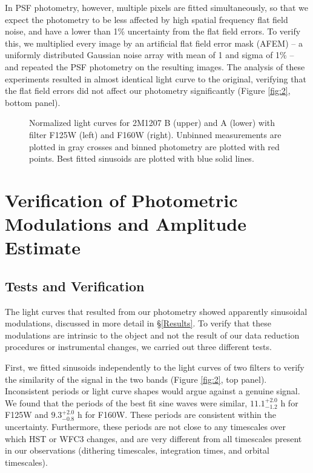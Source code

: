 \documentclass[apj]{emulateapj}
\newcommand{\Jperiod}{$11.1^{+2.0}_{{-1.2}}$}
\newcommand{\Hperiod}{$9.3^{+2.0}_{{-0.8}}$}
\begin{document}
In PSF photometry, however, multiple pixels are fitted simultaneously,
so that we expect the photometry to be less affected by high spatial frequency flat field
noise, and have a lower than 1\% uncertainty from the flat field
errors. To verify this, we multiplied every image by an artificial flat
field error mask (AFEM) -- a uniformly distributed Gaussian noise array with
mean of 1 and sigma of 1\% -- and repeated the PSF photometry on the
resulting images.  The analysis of these experiments resulted in almost
identical light curve to the original, verifying that the flat field
errors did not affect our photometry significantly (Figure
\ref{fig:2}, bottom panel).


\label{Results}

  \begin{figure}
  \centering
  \caption{Normalized light curves for 2M1207 B (upper) and A (lower)
    with filter F125W (left) and F160W (right). Unbinned
  measurements are plotted in gray crosses and binned photometry are
  plotted with red points. Best fitted sinusoids are plotted
  with blue solid lines.}
  \label{fig:3}
\end{figure}

\section{Verification of Photometric Modulations and Amplitude
  Estimate}



\subsection{Tests and Verification}

The light curves that resulted from our photometry showed apparently
sinusoidal modulations, discussed in more detail in
\S\ref{Results}. To verify that these modulations are intrinsic to
the object and not the result of our data reduction procedures or 
instrumental changes, we carried out three different tests.

First, we fitted sinusoids independently to the light curves of two
filters to verify the similarity of the signal in the two bands
(Figure \ref{fig:2}, top panel). Inconsistent periods or light curve
shapes would argue against a genuine signal.  We found that the periods
of the best fit sine waves were similar, \Jperiod{} h for
F125W and \Hperiod{} h for F160W. These periods are consistent
within the uncertainty. Furthermore, these periods are not close to
any timescales over which HST or WFC3 changes, and are
very different from all timescales present in our observations
(dithering timescales, integration times, and orbital timescales).
\end{document}
